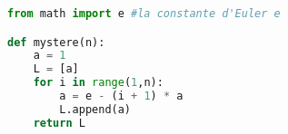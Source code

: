 \begin{lstlisting}[language=python]
from math import e #la constante d'Euler e

def mystere(n):
	a = 1
	L = [a]
	for i in range(1,n):
		a = e - (i + 1) * a
		L.append(a)
	return L
\end{lstlisting}
